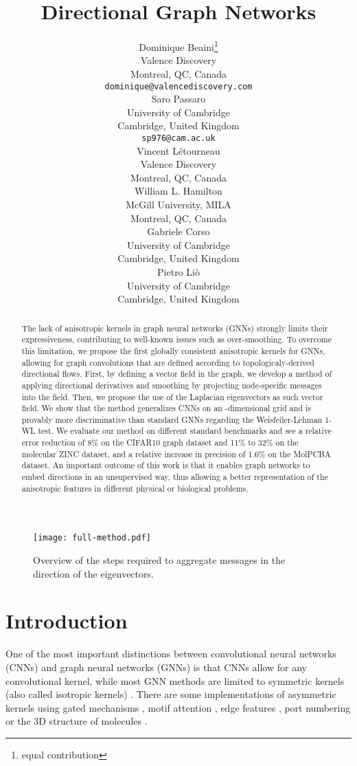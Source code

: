 \documentclass{article} \usepackage{arxiv,times}
\title{Directional Graph Networks}
\author{Dominique Beaini\thanks{equal contribution}\\
Valence Discovery\\
Montreal, QC, Canada\\
\texttt{dominique@valencediscovery.com} \\
\And
Saro Passaro\\
 University of Cambridge \\
Cambridge, United Kingdom \\
\texttt{sp976@cam.ac.uk} \\
\And
Vincent Létourneau\\
Valence Discovery\\
Montreal, QC, Canada\\
\AND
William L. Hamilton \\
McGill University, MILA \\
Montreal, QC, Canada \\
\And
Gabriele Corso \\
University of Cambridge \\
Cambridge, United Kingdom \\
\And
Pietro Li\`{o} \\
 University of Cambridge \\
Cambridge, United Kingdom \\
}
\begin{document}
\maketitle

\begin{abstract}

The lack of anisotropic kernels in graph neural networks (GNNs) strongly limits their expressiveness, contributing to well-known issues such as over-smoothing. To overcome this limitation, we propose the first globally consistent anisotropic kernels for GNNs, allowing for graph convolutions that are defined according to topologicaly-derived directional flows.
First, by defining a vector field in the graph, we develop a method of applying directional derivatives and smoothing by projecting node-specific messages into the field. 
Then, we propose the use of the Laplacian eigenvectors as such vector field.
We show that the method generalizes CNNs on an -dimensional grid and is provably more discriminative than standard GNNs regarding the Weisfeiler-Lehman 1-WL test.
We evaluate our method on different standard benchmarks and see a relative error reduction of 8\% on the CIFAR10 graph dataset and 11\% to 32\% on the molecular ZINC dataset, and a relative increase in precision of 1.6\% on the MolPCBA dataset. 
An important outcome of this work is that it enables graph networks to embed directions in an unsupervised way, thus allowing a better representation of the anisotropic features in different physical or biological problems. 

\end{abstract}


\begin{figure*}[ht]
\centering
 \texttt{[image: full-method.pdf]}
 \vspace{-20pt}
 \caption{Overview of the steps required to aggregate messages in the direction of the eigenvectors.} 
\label{fig:full-method}
\end{figure*}


\section{Introduction}

One of the most important distinctions between convolutional neural networks (CNNs) and graph neural networks (GNNs) is that CNNs allow for any convolutional kernel, while most GNN methods are limited to symmetric kernels (also called isotropic kernels) \cite{kipf2016gcn,gilmer2017mpnn}. There are some implementations of asymmetric kernels using gated mechanisms \cite{bresson2017gatedGCN, velikovic2017gat}, motif attention \cite{peng_graph_2019_motif}, edge features \cite{gilmer2017mpnn}, port numbering \cite{sato2019approximation} or the 3D structure of molecules \cite{klicpera_directional_2019_dimenet}.
\end{document}
